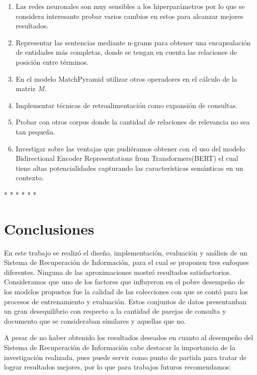 \documentclass{llncs}
\begin{document}
\begin{enumerate}
	\item Las redes neuronales son muy sensibles a los hiperparámetros por lo que se considera interesante probar varios cambios en estos para alcanzar mejores resultados.
	\item Representar las sentencias mediante n-grams para obtener una encapsulación de entidades más completas, donde se tengan en cuenta las relaciones de posición entre términos.
	\item En el modelo MatchPyramid utilizar otros operadores en el cálculo de la matriz $M$.
	\item Implementar técnicas de retroalimentación como expansión de consultas. 
	\item Probar con otros corpus donde la cantidad de relaciones de relevancia no sea tan pequeña.
	\item Investigar sobre las ventajas que pudiéramos obtener con el uso del modelo Bidirectional Encoder Representations from Transformers(BERT) el cual tiene altas potencialidades capturando las características semánticas en un contexto.
\end{enumerate}
* 
* 
* 
* 
* 
* 

\section{Conclusiones}
 
 En este trabajo se realizó  el diseño, implementación, evaluación y análisis de un Sistema de Recuperación de Información, para el cual se proponen tres enfoques diferentes. Ninguna de las aproximaciones mostró resultados satisfactorios. Consideramos que uno de los factores que influyeron en el pobre desempeño de los modelos propustos fue la calidad de las colecciones con que se contó para los procesos de entrenamiento y evaluación. Estos conjuntos de datos presentanban un gran desequilibrio con respecto a la cantidad de parejas de consulta y documento que se consideraban similares y aquellas que no.
 
 A pesar de no haber obtenido los resultados deseados en cuanto al desempeño del Sistema de Recuperación de Información cabe destacar  la importancia de la investigación realizada, pues puede servir como punto de partida para tratar de lograr resultados mejores, por lo que para trabajos futuros recomendamos:
\end{document}
